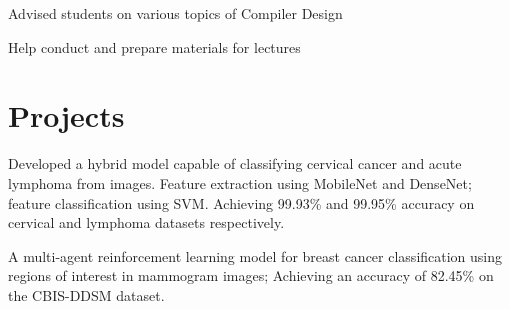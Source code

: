 \documentclass[]{deedy-resume-openfont}
\begin{document}
\begin{minipage}[t]{0.66\textwidth}
	\begin{tightemize}
		\item Advised students on various topics of Compiler Design
		\item Help conduct and prepare materials for lectures
	\end{tightemize}
	\sectionsep


	\section{Projects}
	\begin{tightemize}
		\item Developed a hybrid model capable of classifying cervical cancer and acute lymphoma from images. Feature extraction using MobileNet and DenseNet; feature classification using SVM. Achieving 99.93\% and 99.95\% accuracy on cervical and lymphoma datasets respectively.
	\end{tightemize}
	\sectionsep

	\begin{tightemize}
		\item A multi-agent reinforcement learning model for breast cancer classification using regions of interest in mammogram images; Achieving an accuracy of 82.45\% on the CBIS-DDSM dataset.
	\end{tightemize}
	\sectionsep



\end{minipage}
\end{document}
